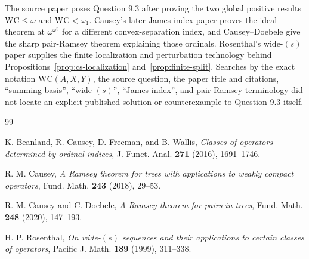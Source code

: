 \documentclass[11pt]{article}
\theoremstyle{definition}
\theoremstyle{remark}
\newcommand{\WC}{\mathrm{WC}}
\begin{document}
The source paper poses Question 9.3 after proving the two global positive results $\WC\leq\omega$ and $\WC<\omega_1$.  Causey's later James-index paper proves the ideal theorem at $\omega^{\omega^\eta}$ for a different convex-separation index, and Causey--Doebele give the sharp pair-Ramsey theorem explaining those ordinals.  Rosenthal's wide-$(s)$ paper supplies the finite localization and perturbation technology behind Propositions~\ref{prop:cs-localization} and~\ref{prop:finite-split}.  Searches by the exact notation $\WC(A,X,Y)$, the source question, the paper title and citations, ``summing basis'', ``wide-$(s)$'', ``James index'', and pair-Ramsey terminology did not locate an explicit published solution or counterexample to Question 9.3 itself.

\begin{thebibliography}{99}

K. Beanland, R. Causey, D. Freeman, and B. Wallis,
\emph{Classes of operators determined by ordinal indices},
J. Funct. Anal. \textbf{271} (2016), 1691--1746.

R. M. Causey,
\emph{A Ramsey theorem for trees with applications to weakly compact operators},
Fund. Math. \textbf{243} (2018), 29--53.

R. M. Causey and C. Doebele,
\emph{A Ramsey theorem for pairs in trees},
Fund. Math. \textbf{248} (2020), 147--193.

H. P. Rosenthal,
\emph{On wide-$(s)$ sequences and their applications to certain classes of operators},
Pacific J. Math. \textbf{189} (1999), 311--338.

\end{thebibliography}
\end{document}
